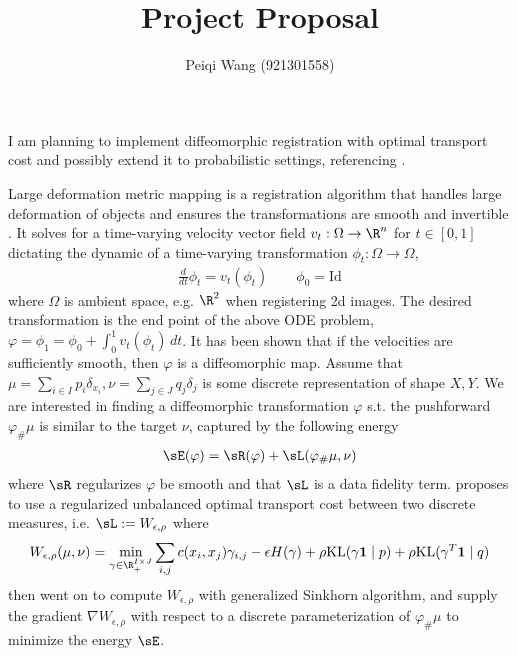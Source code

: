 \documentclass[11pt]{article}
\title{Project Proposal}
\author{Peiqi Wang (921301558)}
\begin{document}
\maketitle


I am planning to implement diffeomorphic registration with optimal transport cost \cite{feydyOptimalTransportDiffeomorphic2017a} and possibly extend it to probabilistic settings, referencing \cite{wassermannProbabilisticDiffeomorphicRegistration2014}.

Large deformation metric mapping is a registration algorithm that handles large deformation of objects and ensures the transformations are smooth and invertible \cite{begComputingLargeDeformation2005}. It solves for a time-varying velocity vector field $v_t: \Omega \to \R^n$ for $t\in [0,1]$ dictating the dynamic of a time-varying transformation $\phi_t:\Omega\to\Omega$, 
\begin{align}
    \frac{d}{dt} \phi_t = v_t(\phi_t)
    \quad\quad
    \phi_0 = \text{Id}
\end{align}
where $\Omega$ is ambient space, e.g. $\R^2$ when registering 2d images. The desired transformation is the end point of the above ODE problem, $\varphi = \phi_1 = \phi_0 + \int_0^1 v_t(\phi_t) \, dt$. It has been shown that if the velocities are sufficiently smooth, then $\varphi$ is a diffeomorphic map. Assume that $\mu = \sum_{i\in I} p_i \delta_{x_i}, \nu = \sum_{j\in J}q_j \delta_j$ is some discrete representation of shape $X,Y$. We are interested in finding a diffeomorphic transformation $\varphi$ s.t. the pushforward $\varphi_{\#}\mu$ is similar to the target $\nu$, captured by the following energy
\begin{align}
    \sE(\varphi)
        = \sR(\varphi) + \sL(\varphi_{\#}\mu, \nu)
\end{align}
where $\sR$ regularizes $\varphi$ be smooth and that $\sL$ is a data fidelity term. \cite{feydyOptimalTransportDiffeomorphic2017a} proposes to use a regularized unbalanced optimal transport cost between two discrete measures, i.e. $\sL := W_{\epsilon,\rho}$ where
\begin{align}
    W_{\epsilon,\rho}(\mu, \nu)
        = \min_{\gamma \in \R_+^{I\times J}} \sum_{i,j} c(x_i,x_j)\gamma_{i,j} - \epsilon H(\gamma) + \rho \text{KL}(\gamma \mathbf{1} \mid p) + \rho \text{KL}(\gamma^T \mathbf{1} \mid q)
\end{align}
\cite{feydyOptimalTransportDiffeomorphic2017a} then went on to compute $W_{\epsilon,\rho}$ with generalized Sinkhorn algorithm, and supply the gradient $\nabla W_{\epsilon,\rho}$ with respect to a discrete parameterization of $\varphi_{\#}\mu$ to minimize the energy $\sE$.
\end{document}
